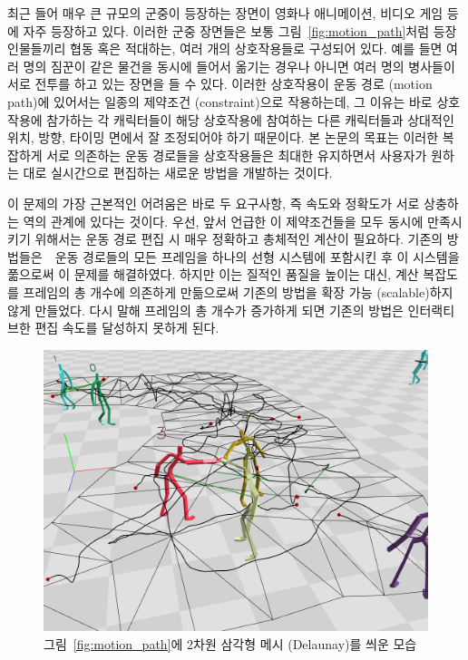 \documentclass[12pt,a4paper,oneside,final]{report}
\newcommand{\KimKwon}{\cite{Kim:2009:SMM:1531326.1531385,Kwon:2008:GME:1360612.1360679}}
\begin{document}
최근 들어 매우 큰 규모의 군중이 등장하는 장면이 영화나 애니메이션, 비디오 게임
등에 자주 등장하고 있다. 이러한 군중 장면들은 보통
그림~\ref{fig:motion_path}처럼 등장인물들끼리 협동 혹은 적대하는, 여러 개의
상호작용들로 구성되어 있다.  예를 들면 여러 명의 짐꾼이 같은 물건을 동시에
들어서 옮기는 경우나 아니면 여러 명의 병사들이 서로 전투를 하고 있는 장면을 들
수 있다. 이러한 상호작용이 운동 경로 (motion path)에 있어서는 일종의 제약조건
(constraint)으로 작용하는데, 그 이유는 바로 상호작용에 참가하는 각 캐릭터들이
해당 상호작용에 참여하는 다른 캐릭터들과 상대적인 위치, 방향, 타이밍 면에서 잘
조정되어야 하기 때문이다.  본 논문의 목표는 이러한 복잡하게 서로 의존하는 운동
경로들을 상호작용들은 최대한 유지하면서 사용자가 원하는 대로 실시간으로
편집하는 새로운 방법을 개발하는 것이다.

이 문제의 가장 근본적인 어려움은 바로 두 요구사항, 즉 속도와 정확도가 서로
상충하는 역의 관계에 있다는 것이다. 우선, 앞서 언급한 이 제약조건들을 모두
동시에 만족시키기 위해서는 운동 경로 편집 시 매우 정확하고 총체적인 계산이
필요하다.  기존의 방법들은~\KimKwon~운동 경로들의 모든 프레임을 하나의 선형
시스템에 포함시킨 후 이 시스템을 풂으로써 이 문제를 해결하였다. 하지만 이는
질적인 품질을 높이는 대신, 계산 복잡도를 프레임의 총 개수에 의존하게 만듦으로써
기존의 방법을 확장 가능 (scalable)하지 않게 만들었다. 다시 말해 프레임의 총
개수가 증가하게 되면 기존의 방법은 인터랙티브한 편집 속도를 달성하지 못하게
된다.

\begin{figure}[htb]
\centering
\includegraphics[width=0.9\linewidth]{motion_path_w_mesh_c.png}
\caption{그림~\ref{fig:motion_path}에 2차원 삼각형 메시 (Delaunay)를 씌운 모습}
\label{fig:motion_path_w_mesh}
\end{figure}
 
\end{document}
